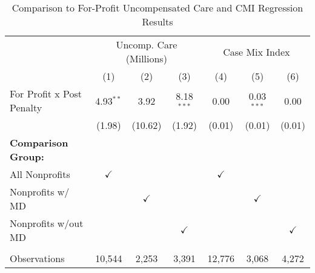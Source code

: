 \begin{table}[htbp]
   \caption{\label{tab:forprofit_uncomp_CMI_fullsample} Comparison to For-Profit Uncompensated Care and CMI Regression Results}
   \bigskip
   \centering
   \begin{tabular}{lcccccc}
      \toprule
       & \multicolumn{3}{c}{Uncomp. Care (Millions)} & \multicolumn{3}{c}{Case Mix Index}\\
                                  & (1)           & (2)           & (3)           & (4)           & (5)           & (6)\\  
      \midrule 
      For Profit x Post Penalty   & 4.93$^{**}$   & 3.92          & 8.18$^{***}$  & 0.00          & 0.03$^{***}$  & 0.00\\   
                                  & (1.98)        & (10.62)       & (1.92)        & (0.01)        & (0.01)        & (0.01)\\   
      \textbf{Comparison Group:}  &               &               &               &               &               & \\  
      All Nonprofits              & $\checkmark$  &               &               & $\checkmark$  &               & \\  
      Nonprofits w/ MD            &               & $\checkmark$  &               &               & $\checkmark$  & \\  
      Nonprofits w/out MD         &               &               & $\checkmark$  &               &               & $\checkmark$\\   
       \\
      Observations                & 10,544        & 2,253         & 3,391         & 12,776        & 3,068         & 4,272\\  
      \bottomrule
   \end{tabular}
\end{table}

